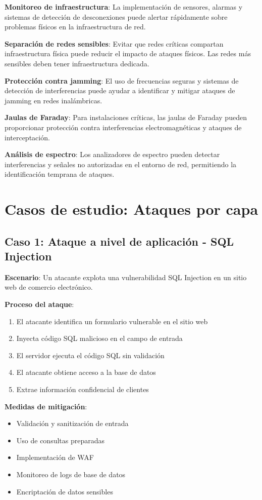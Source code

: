 \textbf{Monitoreo de infraestructura}: La implementación de sensores, alarmas y sistemas de detección de desconexiones puede alertar rápidamente sobre problemas físicos en la infraestructura de red.

\textbf{Separación de redes sensibles}: Evitar que redes críticas compartan infraestructura física puede reducir el impacto de ataques físicos. Las redes más sensibles deben tener infraestructura dedicada.

\textbf{Protección contra jamming}: El uso de frecuencias seguras y sistemas de detección de interferencias puede ayudar a identificar y mitigar ataques de jamming en redes inalámbricas.

\textbf{Jaulas de Faraday}: Para instalaciones críticas, las jaulas de Faraday pueden proporcionar protección contra interferencias electromagnéticas y ataques de interceptación.

\textbf{Análisis de espectro}: Los analizadores de espectro pueden detectar interferencias y señales no autorizadas en el entorno de red, permitiendo la identificación temprana de ataques.

\section{Casos de estudio: Ataques por capa}

\subsection{Caso 1: Ataque a nivel de aplicación - SQL Injection}

\textbf{Escenario}: Un atacante explota una vulnerabilidad SQL Injection en un sitio web de comercio electrónico.

\textbf{Proceso del ataque}:
\begin{enumerate}
    \item El atacante identifica un formulario vulnerable en el sitio web
    \item Inyecta código SQL malicioso en el campo de entrada
    \item El servidor ejecuta el código SQL sin validación
    \item El atacante obtiene acceso a la base de datos
    \item Extrae información confidencial de clientes
\end{enumerate}

\textbf{Medidas de mitigación}:
\begin{itemize}
    \item Validación y sanitización de entrada
    \item Uso de consultas preparadas
    \item Implementación de WAF
    \item Monitoreo de logs de base de datos
    \item Encriptación de datos sensibles
\end{itemize}

